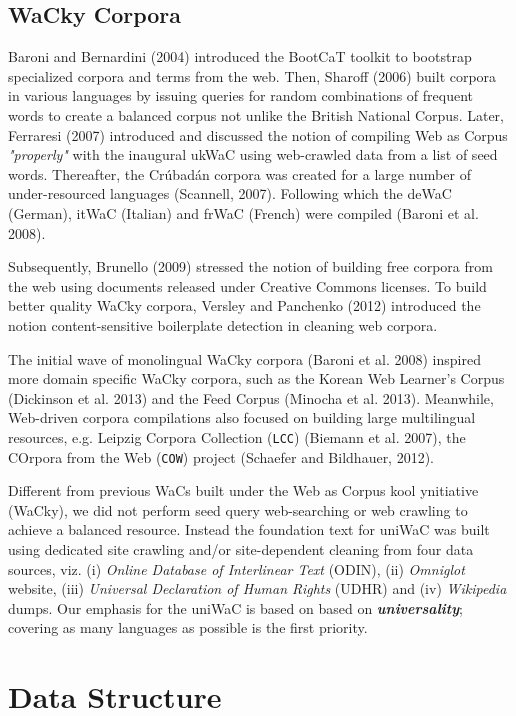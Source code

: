 \documentclass[11pt]{article}
\begin{document}
\subsection{WaCky Corpora}

Baroni and Bernardini (2004) introduced the BootCaT toolkit to bootstrap specialized corpora and terms from the web. Then, Sharoff (2006) built corpora in various languages by issuing queries for random combinations of frequent words to create a balanced corpus not unlike the British National Corpus. Later, Ferraresi (2007) introduced and discussed the notion of compiling Web as Corpus \emph{"properly"} with the inaugural ukWaC using web-crawled data from a list of seed words. Thereafter, the Crúbadán corpora was created for a large number of under-resourced languages (Scannell, 2007). Following which the deWaC (German), itWaC (Italian) and frWaC (French) were compiled (Baroni et al. 2008). 

Subsequently, Brunello (2009) stressed the notion of building free corpora from the web using documents released under Creative Commons licenses. To build better quality WaCky corpora, Versley and Panchenko (2012) introduced the notion content-sensitive boilerplate detection in cleaning web corpora. 

The initial wave of monolingual WaCky corpora (Baroni et al. 2008) inspired more domain specific WaCky corpora, such as the Korean Web Learner's Corpus (Dickinson et al. 2013) and the Feed Corpus (Minocha et al. 2013). Meanwhile, Web-driven corpora compilations also focused on building large  multilingual resources, e.g. Leipzig Corpora Collection (\texttt{LCC}) (Biemann et al. 2007), the COrpora from the Web (\texttt{COW}) project (Schaefer and Bildhauer, 2012).

Different from previous WaCs built under the Web as Corpus kool ynitiative (WaCky), we did not perform seed query web-searching or web crawling to achieve a balanced resource. Instead the foundation text for uniWaC was built using dedicated site crawling and/or site-dependent cleaning from four data sources, viz. (i) \emph{Online Database of Interlinear Text} (ODIN), (ii) \emph{Omniglot} website, (iii) \emph{Universal Declaration of Human Rights} (UDHR) and (iv) \emph{Wikipedia} dumps. Our emphasis for the uniWaC is based on based on \textbf{\emph{universality}}; covering as many languages as possible is the first priority.



\section{Data Structure}
\end{document}
